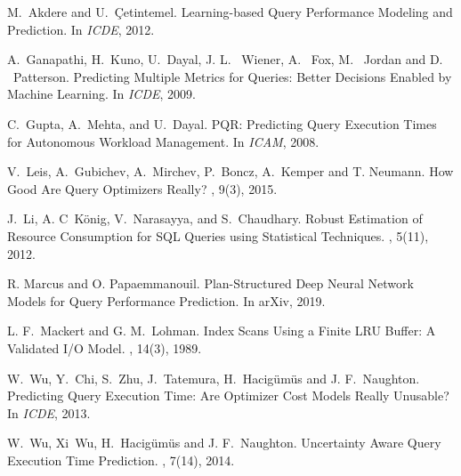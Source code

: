 \documentclass{article}
\begin{document}
\begin{multicols}{2}
    
\begin{thebibliography}{10}
	
	M.~Akdere and U.~{\c C}etintemel.
	\newblock Learning-based Query Performance Modeling and Prediction.
	\newblock In {\em ICDE}, 2012.
	
	A.~Ganapathi, H.~Kuno, U.~Dayal, J. L. ~Wiener, A. ~Fox, M. ~Jordan and D. ~Patterson.
	\newblock Predicting Multiple Metrics for Queries: Better Decisions Enabled by Machine Learning.
	\newblock In {\em ICDE}, 2009.
	
	C.~Gupta, A.~Mehta, and U.~Dayal.
	\newblock PQR: Predicting Query Execution Times for Autonomous Workload Management.
	\newblock In {\em ICAM}, 2008.
	
	V.~Leis, A.~Gubichev, A.~Mirchev, P.~Boncz, A.~Kemper and T. Neumann.
	\newblock How Good Are Query Optimizers Really?
	, 9(3), 2015.
	
	J.~Li, A. C~K{\"o}nig, V.~Narasayya, and S.~Chaudhary.
	\newblock Robust Estimation of Resource Consumption for SQL Queries using Statistical Techniques.
	, 5(11), 2012.
	
	R. Marcus and O. Papaemmanouil.
	\newblock Plan-Structured Deep Neural Network Models for Query Performance Prediction.
	\newblock In {arXiv}, 2019.
	
	L. F.~Mackert and G. M.~Lohman.
	\newblock Index Scans Using a Finite LRU Buffer: A Validated I/O Model.
	, 14(3), 1989.
	
	W.~Wu, Y.~Chi, S.~Zhu, J.~Tatemura, H.~Hacig{\"u}m{\"u}s and J. F.~Naughton.
	\newblock Predicting Query Execution Time: Are Optimizer Cost Models Really Unusable?
	\newblock In {\em ICDE}, 2013.
	
	W.~Wu, Xi~Wu, H.~Hacig{\"u}m{\"u}s and J. F.~Naughton.
	\newblock Uncertainty Aware Query Execution Time Prediction.
	, 7(14), 2014.
	
\end{thebibliography}

	\end{multicols}
\end{document}
